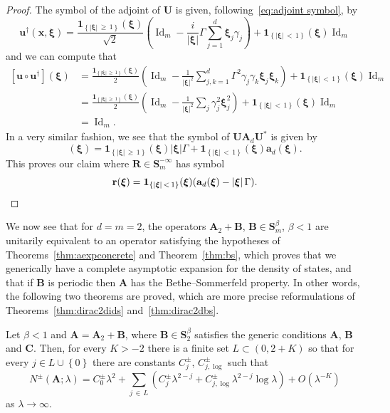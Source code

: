\documentclass[AHL,Unicode,longabstracts,published]{cedram}
\DeclareMathOperator{\Id}{Id}
\newcommand{\bxi}{\boldsymbol \xi}
\newcommand{\bone}{\boldsymbol 1}
\newcommand{\ba}{\mathbf a}
\newcommand{\BA}{\mathbf A}
\newcommand{\BB}{\mathbf B}
\newcommand{\BS}{\mathbf S}
\newcommand{\BR}{\mathbf R}
\newcommand{\BU}{\mathbf U}
\newcommand{\bx}{\mathbf x}
\newcommand{\br}{\mathbf r}
\newcommand{\bu}{\mathbf u}
\newcommand{\bigo}[1]{O\left(#1 \right)}
\newcommand{\abs}[1]{\left\lvert #1 \right\rvert}
\newcommand{\set}[1]{\left\{ #1 \right\}}
\begin{document}
\begin{proof}
The symbol of the adjoint of $\BU$ is given, following~\eqref{eq:adjoint symbol}, by
\begin{equation}
\bu^\dagger(\bx,\bxi) = \frac{\bone_{\set{\abs \bxi\,\ge\,1}}(\bxi)}{\sqrt 2}\left(\Id_m - \frac{i}{\abs \bxi} \Gamma
\sum_{j=1}^d \bxi_j \gamma_j\right) + \bone_{\set{\abs{\bxi}\,<\,1}}(\bxi)
\Id_m
\end{equation}
and we can compute that
\begin{equation}
\begin{aligned}
\left[\bu\circ \bu^\dagger \right] (\bxi) &= \frac{\bone_{\set{\abs \bxi
\,\ge\,1}}(\bxi)}{2}\left(\Id_m -
\frac{1}{\abs{\bxi}^2} \sum_{j,k = 1}^d \Gamma^2 \gamma_j \gamma_k \bxi_j
\bxi_k\right) + \bone_{\set{\abs \bxi\,< \,1}}(\bxi) \Id_m \\
&= \frac{\bone_{\set{ \abs \bxi\,\ge\,1}}(\bxi)}{2} \left(\Id_m - \frac{1}{\abs{\bxi}^2} \sum_j \gamma_j^2
\bxi_j^2\right) + \bone_{\set{\abs \bxi\,< \,1}}(\bxi) \Id_m\\
&= \Id_m.
\end{aligned}
\end{equation}
In a very similar fashion, we see that the symbol of $\BU \BA_d \BU^*$ is given by
\begin{equation}
[\bu \circ \ba_d \circ \bu^\dagger](\bxi) = \bone_{\set{\abs \bxi\,\ge\,1 }}(\bxi) \abs \bxi\Gamma + \bone_{\set{\abs \bxi\,<\,1}}(\bxi) \ba_d(\bxi).
\end{equation}
This proves our claim where $\BR \in \BS_m^{-\infty}$ has symbol
\begin{equation}
\br(\bxi)= \bone_{\set{\abs \bxi\,<\,1}} (\bxi) (\ba_d(\bxi) - \abs \bxi
\Gamma).\qedhere
\end{equation}
\end{proof}

We now see that for $d = m = 2$, the operators $\BA_2 + \BB$, $\BB \in \BS^\beta_m$, $\beta < 1$ are unitarily equivalent to an operator satisfying the hypotheses of Theorems~\ref{thm:aexpconcrete} and Theorem~\ref{thm:bs}, which proves that we generically have a complete asymptotic expansion for the density of states, and that if $\BB$ is periodic then $\BA$ has the Bethe--Sommerfeld property. In other words, the following two theorems are proved, which are more precise reformulations of Theorems~\ref{thm:dirac2dids} and~\ref{thm:dirac2dbs}.

\begin{theo}
Let $\beta < 1$ and $\BA = \BA_2 + \BB$, where $\BB \in \BS_2^\beta$ satisfies the generic conditions \textbf{A}, \textbf B and \textbf C. Then, for every $K > - 2$ there is a finite set $L \subset (0,2+K)$ so that for every $j \in L
\cup \set{0}$ there are constants $C_{j}^\pm$, $C_{j,\log}^\pm$ such that
\begin{equation}
N^\pm(\BA; \lambda) = C_0^\pm \lambda^2 + \sum_{j\,\in\,L} \left(C_j^\pm
\lambda^{2 - j} + C_{j,\log}^\pm \lambda^{2-j} \log \lambda \right) +
\bigo{\lambda^{-K}}
\end{equation}
as $\lambda \to \infty$.
\end{theo}
\end{document}
